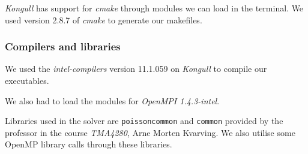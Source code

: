 \emph{Kongull} has support for \emph{cmake} through modules we can load in the terminal. We used version 2.8.7 of \emph{cmake} to generate our makefiles. 

\subsubsection{Compilers and libraries} %
\label{ssub:compilers}
We used the \emph{intel-compilers} version 11.1.059 on \emph{Kongull} to compile our executables. 

We also had to load the modules for \emph{OpenMPI 1.4.3-intel}. 

Libraries used in the solver are \texttt{poissoncommon} and \texttt{common} provided by the professor in the course \emph{TMA4280}, Arne Morten Kvarving. We also utilise some OpenMP library calls through these libraries.




